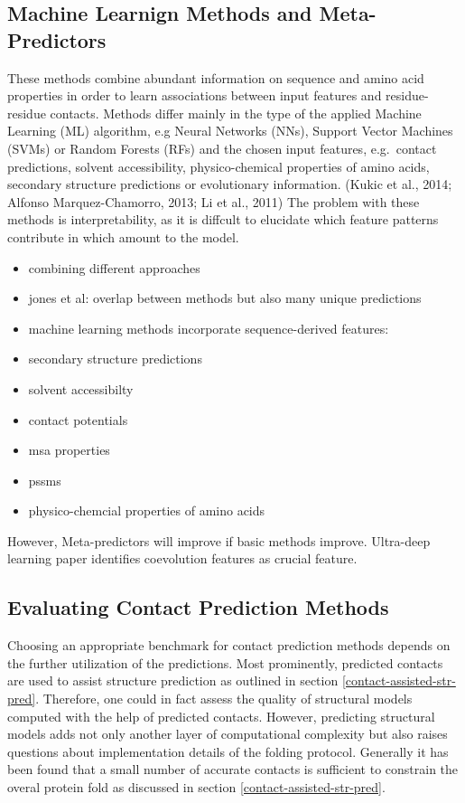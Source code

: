 \documentclass[12pt,a4paper,twoside]{book}
\providecommand{\tightlist}{%
  \setlength{\itemsep}{0pt}\setlength{\parskip}{0pt}}
\theoremstyle{definition}
\theoremstyle{definition}
\theoremstyle{remark}
\begin{document}
\subsection{Machine Learnign Methods and
Meta-Predictors}\label{machine-learnign-methods-and-meta-predictors}

These methods combine abundant information on sequence and amino acid
properties in order to learn associations between input features and
residue-residue contacts. Methods differ mainly in the type of the
applied Machine Learning (ML) algorithm, e.g Neural Networks (NNs),
Support Vector Machines (SVMs) or Random Forests (RFs) and the chosen
input features, e.g.~contact predictions, solvent accessibility,
physico-chemical properties of amino acids, secondary structure
predictions or evolutionary information. (Kukic et al., 2014; Alfonso
Marquez-Chamorro, 2013; Li et al., 2011) The problem with these methods
is interpretability, as it is diffcult to elucidate which feature
patterns contribute in which amount to the model.

\begin{itemize}
\tightlist
\item
  combining different approaches
\item
  jones et al: overlap between methods but also many unique predictions
\item
  machine learning methods incorporate sequence-derived features:
\item
  secondary structure predictions
\item
  solvent accessibilty
\item
  contact potentials
\item
  msa properties
\item
  pssms
\item
  physico-chemcial properties of amino acids
\end{itemize}

However, Meta-predictors will improve if basic methods improve.
Ultra-deep learning paper identifies coevolution features as crucial
feature.

\subsection{Evaluating Contact Prediction
Methods}\label{intro-cp-evaluation}

Choosing an appropriate benchmark for contact prediction methods depends
on the further utilization of the predictions. Most prominently,
predicted contacts are used to assist structure prediction as outlined
in section \ref{contact-assisted-str-pred}. Therefore, one could in fact
assess the quality of structural models computed with the help of
predicted contacts. However, predicting structural models adds not only
another layer of computational complexity but also raises questions
about implementation details of the folding protocol. Generally it has
been found that a small number of accurate contacts is sufficient to
constrain the overal protein fold as discussed in section
\ref{contact-assisted-str-pred}.
\end{document}
